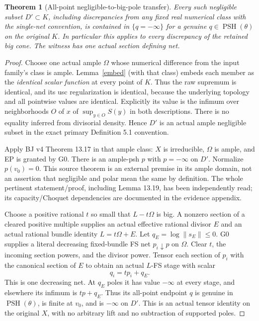 \documentclass[10pt]{article}
\newtheorem{theorem}{Theorem}[section]
\newcommand{\PSH}{\operatorname{PSH}}
\begin{document}
\begin{theorem}[All-point negligible-to-big-pole transfer]\label{neglig}
Every such negligible subset $D'\subset K$, including discrepancies
from any fixed real numerical class with the single-net convention,
is contained in $\{q=-\infty\}$ for a genuine
$q\in\PSH(\theta)$ on the original $K$.
In particular this applies to every discrepancy of the retained big
cone. The witness has one actual section defining net.
\end{theorem}
\begin{proof}
Choose one actual ample $\Omega$ whose numerical difference from
the input family's class is ample. Lemma~\ref{embed} (with that
class) embeds each member as the \emph{identical scalar function} at
every point of $K$. Thus the raw supremum is identical, and its usc
regularization is identical, because the underlying topology and all
pointwise values are identical. Explicitly its value is the infimum
over neighborhoods $O$ of $x$ of $\sup_{y\in O}S(y)$ in both
descriptions. There is no equality inferred from divisorial density.
Hence $D'$ is an actual ample negligible subset in the exact primary
Definition 5.1 convention.

Apply BJ v4 Theorem 13.17 in that ample class: $X$ is irreducible,
$\Omega$ is ample, and EP is granted by G0. There is an ample-psh
$p$ with $p=-\infty$ on $D'$. Normalize $p(v_0)=0$.
This source theorem is an external premise in its ample domain,
not an assertion that negligible and polar mean the same by definition.
The whole pertinent statement/proof, including Lemma 13.19, has
been independently read; its capacity/Choquet dependencies are
documented in the evidence appendix.

Choose a positive rational $t$ so small that $L-t\Omega$ is big.
A nonzero section of a cleared positive multiple supplies an actual
effective rational divisor $E$ and an actual rational bundle identity
$L=t\Omega+E$. Let $q_E=\log\|s_E\|\leq0$.
G0 supplies a literal decreasing fixed-bundle FS net $p_i\downarrow p$
on $\Omega$. Clear $t$, the incoming section powers, and the divisor
power. Tensor each section of $p_i$ with the canonical section of
$E$ to obtain an actual $L$-FS stage with scalar
\[
 q_i=t p_i+q_E.
\]
This is one decreasing net. At $q_E$ poles it has value
$-\infty$ at every stage, and elsewhere its infimum is
$tp+q_E$. Thus its all-point endpoint $q$ is genuine in
$\PSH(\theta)$, is finite at $v_0$, and is $-\infty$ on $D'$.
This is an actual tensor identity on the original $X$, with no
arbitrary lift and no subtraction of supported poles.
\end{proof}
\end{document}
